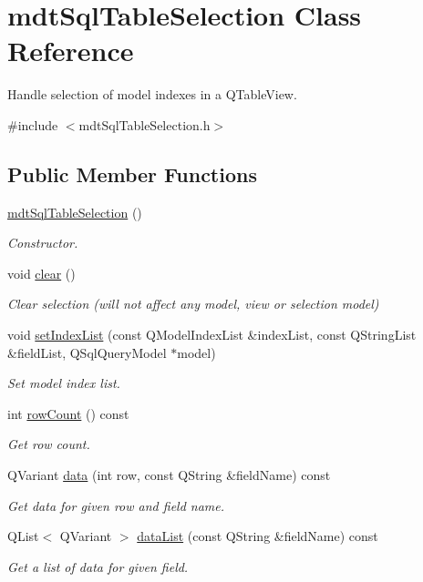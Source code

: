 \hypertarget{classmdt_sql_table_selection}{\section{mdt\-Sql\-Table\-Selection Class Reference}
\label{classmdt_sql_table_selection}
}


Handle selection of model indexes in a Q\-Table\-View.  




{\ttfamily \#include $<$mdt\-Sql\-Table\-Selection.\-h$>$}

\subsection*{Public Member Functions}
\begin{DoxyCompactItemize}
\item 
\hyperlink{classmdt_sql_table_selection_a2821fe9269802a36b77b89d8e22bb10b}{mdt\-Sql\-Table\-Selection} ()
\begin{DoxyCompactList}\small\item\em Constructor. \end{DoxyCompactList}\item 
void \hyperlink{classmdt_sql_table_selection_ab233d9312c053b20a8e1d35e26dcab86}{clear} ()
\begin{DoxyCompactList}\small\item\em Clear selection (will not affect any model, view or selection model) \end{DoxyCompactList}\item 
void \hyperlink{classmdt_sql_table_selection_a8a7fec3deddde52a3cfdb2ea96a75894}{set\-Index\-List} (const Q\-Model\-Index\-List \&index\-List, const Q\-String\-List \&field\-List, Q\-Sql\-Query\-Model $\ast$model)
\begin{DoxyCompactList}\small\item\em Set model index list. \end{DoxyCompactList}\item 
int \hyperlink{classmdt_sql_table_selection_a411d70a724981bd47f550d05cf3858be}{row\-Count} () const 
\begin{DoxyCompactList}\small\item\em Get row count. \end{DoxyCompactList}\item 
Q\-Variant \hyperlink{classmdt_sql_table_selection_a30a3f85a56792d9641abbd2129c50bca}{data} (int row, const Q\-String \&field\-Name) const 
\begin{DoxyCompactList}\small\item\em Get data for given row and field name. \end{DoxyCompactList}\item 
Q\-List$<$ Q\-Variant $>$ \hyperlink{classmdt_sql_table_selection_a51db96b59cc388c6d4bb2d4e4fdcea51}{data\-List} (const Q\-String \&field\-Name) const 
\begin{DoxyCompactList}\small\item\em Get a list of data for given field. \end{DoxyCompactList}\end{DoxyCompactItemize}


